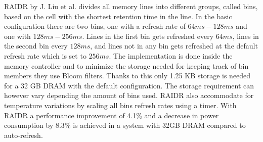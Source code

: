 RAIDR by J. Liu et al. \cite{raidr} divides all memory lines into different groups, called bins, based on the cell with the shortest retention time in the line. In the basic configuration there are two bins, one with a refresh rate of \(64ms - 128ms\) and one with \(128ms - 256ms\). Lines in the first bin gets refreshed every \(64ms\), lines in the second bin every \(128ms\), and lines not in any bin gets refreshed at the default refresh rate which is set to \(256ms\). The implementation is done inside the memory controller and to minimize the storage needed for keeping track of bin members they use Bloom filters. Thanks to this only 1.25 KB storage is needed for a 32 GB DRAM with the default configuration. The storage requirement can however vary depending the amount of bins used. RAIDR also accommodate for temperature variations by scaling all bins refresh rates using a timer. With RAIDR a performance improvement of 4.1\% and a decrease in power consumption by 8.3\% is achieved in a system with 32GB DRAM compared to auto-refresh.